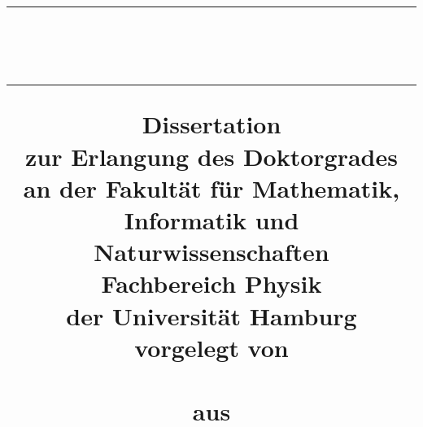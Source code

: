 %
%
%
%
%

%
%

\title{%
   \doublespacing
   \normalfont
   \Large
   \vspace{1cm}
   \hrule height 1.5pt
   \vspace{1ex}
   {\huge\textbf \thetitle\\}
   \vspace{1ex}\hrule height 1.5pt
   \vspace{2cm}
   {\LARGE \textbf{Dissertation}\\}
   {%
   zur Erlangung des Doktorgrades\\
   an der Fakult\"at f\"ur Mathematik,\\
   Informatik und Naturwissenschaften\\
   Fachbereich Physik\\
   der Universit\"{a}t Hamburg\\
   }
   {\Large
   \vspace{2.5cm}
   vorgelegt von\\
   \vspace{0.2cm}
   \textsc{\theauthor}\\
   \vspace{0.2cm}
   aus\\
   \vspace{0.2cm}
   \textsc{\thebirthplace}\\
   }
   \vspace{2cm}
   {
   \theplace\\
   \theyear
   }
}

\author{}
\date{}

\renewcommand*{\coverpagetopmargin}{0mm}
\renewcommand*{\coverpagebottommargin}{0mm}

\maketitle
